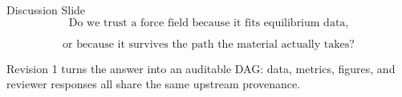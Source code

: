 \documentclass[aspectratio=169,10pt]{beamer}
\begin{document}
\begin{frame}{Discussion Slide}
  \Large
  \[
  \boxed{
  \text{Do we trust a force field because it fits equilibrium data,}
  }
  \]

  \vspace{0.2cm}
  \Large
  \[
  \boxed{
  \text{or because it survives the path the material actually takes?}
  }
  \]

  \vspace{0.5cm}
  \normalsize
  Revision 1 turns the answer into an auditable DAG: data, metrics, figures, and reviewer responses all share the same upstream provenance.
\end{frame}
\end{document}
